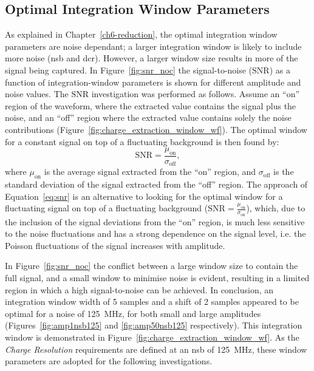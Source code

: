 \subsection{Optimal Integration Window Parameters}

As explained in Chapter~\ref{ch6-reduction}, the optimal integration window parameters are noise dependant; a larger integration window is likely to include more noise (\gls{nsb} and \gls{dcr}). However, a larger window size results in more of the signal being captured. In Figure~\ref{fig:snr_noc} the signal-to-noise ($\text{SNR}$) as a function of integration-window parameters is shown for different amplitude and noise values. The $\text{SNR}$ investigation was performed as follows. Assume an ``on'' region of the waveform, where the extracted value contains the signal plus the noise, and an ``off'' region where the extracted value contains solely the noise contributions (Figure~\ref{fig:charge_extraction_window_wf}). The optimal window for a constant signal on top of a fluctuating background is then found by:
\begin{equation} \label{eq:snr}
\text{SNR} = \frac{\mu_\text{on}}{\sigma_\text{off}},
\end{equation}
where $\mu_\text{on}$ is the average signal extracted from the ``on'' region, and $\sigma_\text{off}$ is the standard deviation of the signal extracted from the ``off'' region. The approach of Equation~\ref{eq:snr} is an alternative to looking for the optimal window for a fluctuating signal on top of a fluctuating background ($\text{SNR} = \frac{\mu_\text{on}}{\sigma_\text{on}}$), which, due to the inclusion of the signal deviations from the ``on'' region, is much less sensitive to the noise fluctuations and has a strong dependence on the signal level, i.e. the Poisson fluctuations of the signal increases with amplitude.

In Figure~\ref{fig:snr_noc} the conflict between a large window size to contain the full signal, and a small window to minimise noise is evident, resulting in a limited region in which a high signal-to-noise can be achieved. In conclusion, an integration window width of 5 samples and a shift of 2 samples appeared to be optimal for a noise of \SI{125}{MHz}, for both small and large amplitudes (Figures~\ref{fig:amp1nsb125} and \ref{fig:amp50nsb125} respectively). This integration window is demonstrated in Figure~\ref{fig:charge_extraction_window_wf}. As the \textit{Charge Resolution} requirements are defined at an \gls{nsb} of \SI{125}{MHz}, these window parameters are adopted for the following investigations.

